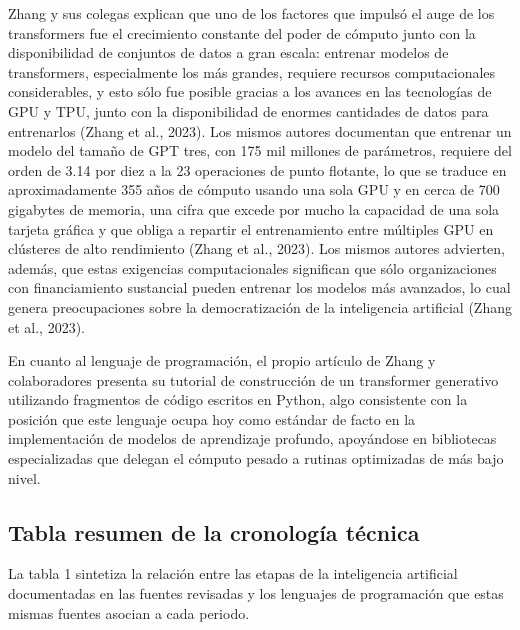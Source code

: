 \documentclass[12pt,letterpaper]{article}
\begin{document}
Zhang y sus colegas explican que uno de los factores que impuls\'o el auge de los transformers fue el crecimiento constante del poder de c\'omputo junto con la disponibilidad de conjuntos de datos a gran escala: entrenar modelos de transformers, especialmente los m\'as grandes, requiere recursos computacionales considerables, y esto s\'olo fue posible gracias a los avances en las tecnolog\'ias de GPU y TPU, junto con la disponibilidad de enormes cantidades de datos para entrenarlos (Zhang et al., 2023). Los mismos autores documentan que entrenar un modelo del tama\~no de GPT tres, con 175 mil millones de par\'ametros, requiere del orden de 3.14 por diez a la 23 operaciones de punto flotante, lo que se traduce en aproximadamente 355 a\~nos de c\'omputo usando una sola GPU y en cerca de 700 gigabytes de memoria, una cifra que excede por mucho la capacidad de una sola tarjeta gr\'afica y que obliga a repartir el entrenamiento entre m\'ultiples GPU en cl\'usteres de alto rendimiento (Zhang et al., 2023). Los mismos autores advierten, adem\'as, que estas exigencias computacionales significan que s\'olo organizaciones con financiamiento sustancial pueden entrenar los modelos m\'as avanzados, lo cual genera preocupaciones sobre la democratizaci\'on de la inteligencia artificial (Zhang et al., 2023).

En cuanto al lenguaje de programaci\'on, el propio art\'iculo de Zhang y colaboradores presenta su tutorial de construcci\'on de un transformer generativo utilizando fragmentos de c\'odigo escritos en Python, algo consistente con la posici\'on que este lenguaje ocupa hoy como est\'andar de facto en la implementaci\'on de modelos de aprendizaje profundo, apoy\'andose en bibliotecas especializadas que delegan el c\'omputo pesado a rutinas optimizadas de m\'as bajo nivel.

\subsection{Tabla resumen de la cronolog\'ia t\'ecnica}

La tabla 1 sintetiza la relaci\'on entre las etapas de la inteligencia artificial documentadas en las fuentes revisadas y los lenguajes de programaci\'on que estas mismas fuentes asocian a cada periodo.
\end{document}

